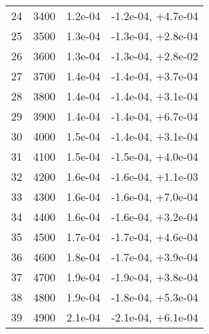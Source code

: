 \begin{table}
\begin{adjustbox}{width=1\textwidth/2}
\begin{tabular}{|c|c|c|c|}
\cline{1-4}
24 & 3400 & 1.2e-04 & -1.2e-04, +4.7e-04 \\
\cline{1-4}
25 & 3500 & 1.3e-04 & -1.3e-04, +2.8e-04 \\
\cline{1-4}
26 & 3600 & 1.3e-04 & -1.3e-04, +2.8e-02 \\
\cline{1-4}
27 & 3700 & 1.4e-04 & -1.4e-04, +3.7e-04 \\
\cline{1-4}
28 & 3800 & 1.4e-04 & -1.4e-04, +3.1e-04 \\
\cline{1-4}
29 & 3900 & 1.4e-04 & -1.4e-04, +6.7e-04 \\
\cline{1-4}
30 & 4000 & 1.5e-04 & -1.4e-04, +3.1e-04 \\
\cline{1-4}
31 & 4100 & 1.5e-04 & -1.5e-04, +4.0e-04 \\
\cline{1-4}
32 & 4200 & 1.6e-04 & -1.6e-04, +1.1e-03 \\
\cline{1-4}
33 & 4300 & 1.6e-04 & -1.6e-04, +7.0e-04 \\
\cline{1-4}
34 & 4400 & 1.6e-04 & -1.6e-04, +3.2e-04 \\
\cline{1-4}
35 & 4500 & 1.7e-04 & -1.7e-04, +4.6e-04 \\
\cline{1-4}
36 & 4600 & 1.8e-04 & -1.7e-04, +3.9e-04 \\
\cline{1-4}
37 & 4700 & 1.9e-04 & -1.9e-04, +3.8e-04 \\
\cline{1-4}
38 & 4800 & 1.9e-04 & -1.8e-04, +5.3e-04 \\
\cline{1-4}
39 & 4900 & 2.1e-04 & -2.1e-04, +6.1e-04 \\
\cline{1-4}
\end{tabular}
\end{adjustbox}
\end{table}

